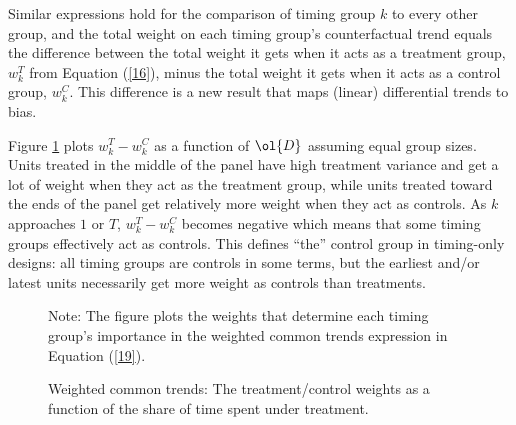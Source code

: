\documentclass[12pt]{article}
\newcommand{\CiteReference}{../Notes/reference.bib}
\theoremstyle{definition}
\begin{document}
Similar expressions hold for the comparison of timing group $k$ to every other group, and the total weight on each timing group's counterfactual trend equals the difference between the total weight it gets when it acts as a treatment group, $w_{k}^{T}$ from Equation (\ref{16}), minus the total weight it gets when it acts as a control group, $w_{k}^{C}$. This difference is a new result that maps (linear) differential trends to bias.

Figure \ref{goodman-baconDifferenceinDifferencesVariationTreatment2021_fig4} plots $w_{k}^{T} - w_{k}^{C}$ as a function of $\ol{D}$ assuming equal group sizes. Units treated in the middle of the panel have high treatment variance and get a lot of weight when they act as the treatment group, while units treated toward the ends of the panel get relatively more weight when they act as controls. As $k$ approaches $1$ or $T$, $w_{k}^{T} - w_{k}^{C}$ becomes negative which means that some timing groups effectively act as controls. This defines ``the'' control group in timing-only designs: all timing groups are controls in some terms, but the earliest and/or latest units necessarily get more weight as controls than treatments.

\begin{figure}[H]
    \noindent\caption{Weighted common trends: The treatment/control weights as a function of the share of time spent under treatment.}
    \begin{center}
    \end{center}
    \medskip
    {\footnotesize Note: The figure plots the weights that determine each timing group's importance in the weighted common trends expression in Equation (\ref{19}).}
    \label{goodman-baconDifferenceinDifferencesVariationTreatment2021_fig4}
\end{figure}


\end{document}
